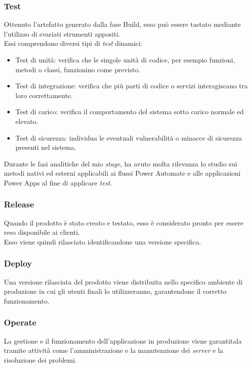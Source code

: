 \subsubsection*{Test}
Ottenuto l'artefatto generato dalla fase Build, esso può essere tastato mediante l'utilizzo di svariati strumenti appositi.\\
Essi comprendono diversi tipi di \emph{test} dinamici: 
\begin{itemize}
    \item Test di unità: verifica che le singole unità di codice, per esempio funzioni, metodi o classi, funzionino come previsto.
    \item Test di integrazione: verifica che più parti di codice o servizi interagiscano tra loro correttamente.
    \item Test di carico: verifica il comportamento del sistema sotto carico normale ed elevato.
    \item Test di sicurezza: individua le eventuali vulnerabilità o minacce di sicurezza presenti nel sistema. 
\end{itemize}
Durante le fasi analitiche del mio \emph{stage}, ha avuto molta rilevanza lo studio sui metodi nativi ed esterni applicabili ai flussi Power Automate e alle applicazioni Power Apps al fine di applicare \emph{test}. 

\subsubsection*{Release}
Quando il prodotto è stato creato e testato, esso è considerato pronto per essere reso disponibile ai clienti.\\
Esso viene quindi rilasciato identificandone una versione specifica.

\subsubsection*{Deploy}
Una versione rilasciata del prodotto viene distribuita nello specifico ambiente di produzione in cui gli utenti finali lo utilizzeranno, garantendone il corretto funzionamento.

\subsubsection*{Operate}
La gestione e il funzionamento dell'applicazione in produzione viene garantitala tramite attività come l'amministrazione e la manutenzione dei \emph{server} e la risoluzione dei problemi. 

